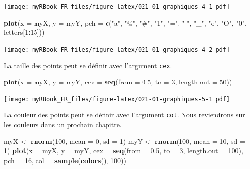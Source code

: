 \documentclass[]{book}
\newenvironment{Shaded}{\begin{snugshade}}{\end{snugshade}}
\newcommand{\DataTypeTok}[1]{\textcolor[rgb]{0.13,0.29,0.53}{#1}}
\newcommand{\DecValTok}[1]{\textcolor[rgb]{0.00,0.00,0.81}{#1}}
\newcommand{\FloatTok}[1]{\textcolor[rgb]{0.00,0.00,0.81}{#1}}
\newcommand{\KeywordTok}[1]{\textcolor[rgb]{0.13,0.29,0.53}{\textbf{#1}}}
\newcommand{\NormalTok}[1]{#1}
\newcommand{\OperatorTok}[1]{\textcolor[rgb]{0.81,0.36,0.00}{\textbf{#1}}}
\newcommand{\StringTok}[1]{\textcolor[rgb]{0.31,0.60,0.02}{#1}}
\begin{document}
\texttt{[image: myRBook\_FR\_files/figure-latex/021-01-graphiques-4-1.pdf]}

\begin{Shaded}
\begin{Highlighting}[]
\KeywordTok{plot}\NormalTok{(}\DataTypeTok{x =}\NormalTok{ myX, }\DataTypeTok{y =}\NormalTok{ myY, }
  \DataTypeTok{pch =} \KeywordTok{c}\NormalTok{(}\StringTok{"a"}\NormalTok{, }\StringTok{"@"}\NormalTok{, }\StringTok{"#"}\NormalTok{, }\StringTok{"1"}\NormalTok{, }\StringTok{"="}\NormalTok{, }\StringTok{"-"}\NormalTok{, }\StringTok{"_"}\NormalTok{, }\StringTok{"o"}\NormalTok{, }\StringTok{"O"}\NormalTok{, }\StringTok{"0"}\NormalTok{, letters[}\DecValTok{1}\OperatorTok{:}\DecValTok{15}\NormalTok{]))}
\end{Highlighting}
\end{Shaded}

\texttt{[image: myRBook\_FR\_files/figure-latex/021-01-graphiques-4-2.pdf]}

La taille des points peut se définir avec l'argument \texttt{cex}.

\begin{Shaded}
\begin{Highlighting}[]
\KeywordTok{plot}\NormalTok{(}\DataTypeTok{x =}\NormalTok{ myX, }\DataTypeTok{y =}\NormalTok{ myY, }
  \DataTypeTok{cex =} \KeywordTok{seq}\NormalTok{(}\DataTypeTok{from =} \FloatTok{0.5}\NormalTok{, }\DataTypeTok{to =} \DecValTok{3}\NormalTok{, }\DataTypeTok{length.out =} \DecValTok{50}\NormalTok{))}
\end{Highlighting}
\end{Shaded}

\texttt{[image: myRBook\_FR\_files/figure-latex/021-01-graphiques-5-1.pdf]}

La couleur des points peut se définir avec l'argument \texttt{col}. Nous reviendrons sur les couleurs dans un prochain chapitre.

\begin{Shaded}
\begin{Highlighting}[]
\NormalTok{myX <-}\StringTok{ }\KeywordTok{rnorm}\NormalTok{(}\DecValTok{100}\NormalTok{, }\DataTypeTok{mean =} \DecValTok{0}\NormalTok{, }\DataTypeTok{sd =} \DecValTok{1}\NormalTok{)}
\NormalTok{myY <-}\StringTok{ }\KeywordTok{rnorm}\NormalTok{(}\DecValTok{100}\NormalTok{, }\DataTypeTok{mean =} \DecValTok{10}\NormalTok{, }\DataTypeTok{sd =} \DecValTok{1}\NormalTok{)}
\KeywordTok{plot}\NormalTok{(}\DataTypeTok{x =}\NormalTok{ myX, }\DataTypeTok{y =}\NormalTok{ myY, }
  \DataTypeTok{cex =} \KeywordTok{seq}\NormalTok{(}\DataTypeTok{from =} \FloatTok{0.5}\NormalTok{, }\DataTypeTok{to =} \DecValTok{3}\NormalTok{, }\DataTypeTok{length.out =} \DecValTok{100}\NormalTok{),}
  \DataTypeTok{pch =} \DecValTok{16}\NormalTok{,}
  \DataTypeTok{col =} \KeywordTok{sample}\NormalTok{(}\KeywordTok{colors}\NormalTok{(), }\DecValTok{100}\NormalTok{))}
\end{Highlighting}
\end{Shaded}
\end{document}
